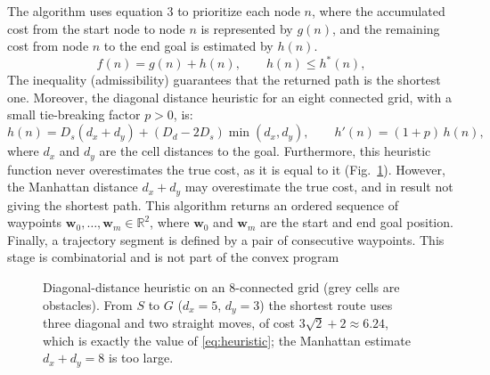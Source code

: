 The algorithm uses equation 3 to prioritize each node $n$, where the accumulated cost from the start node to node $n$ is represented by $g(n)$, and the remaining cost from node $n$ to the end goal is estimated by $h(n)$.
\begin{equation}
f(n) = g(n) + h(n), \qquad h(n) \le h^*(n),
\label{eq:astar}
\end{equation}
 The inequality (admissibility) guarantees that the returned path is the shortest one.
 Moreover, the diagonal distance heuristic for an eight connected grid, with a small tie-breaking factor $p>0$, is:
\begin{equation}
h(n) = D_s(d_x+d_y) + (D_d-2D_s)\min(d_x,d_y), \qquad h'(n) = (1+p)\,h(n),
\label{eq:heuristic}
\end{equation}
where $d_x$ and $d_y$ are the cell distances to the goal. Furthermore, this heuristic function never overestimates the true cost, as it is equal to it (Fig.~\ref{fig:grid}). However, the Manhattan distance $d_x+d_y$ may overestimate the true cost, and in result not giving the shortest path. 
This algorithm returns an ordered sequence of waypoints $\mathbf{w}_0,\ldots,\mathbf{w}_m \in \mathbb{R}^2$, where $\mathbf{w}_0$ and $\mathbf{w}_m$ are the start and end goal position. Finally, a trajectory segment is defined by a pair of consecutive waypoints. This stage is combinatorial and is not part of the convex program

\begin{figure}[htbp]
\centering
{}
\caption{Diagonal-distance heuristic on an 8-connected grid (grey cells are obstacles). From $S$ to $G$ ($d_x=5$, $d_y=3$) the shortest route uses three diagonal and two straight moves, of cost $3\sqrt{2}+2 \approx 6.24$, which is exactly the value of \eqref{eq:heuristic}; the Manhattan estimate $d_x+d_y=8$ is too large.}
\label{fig:grid}
\end{figure}

